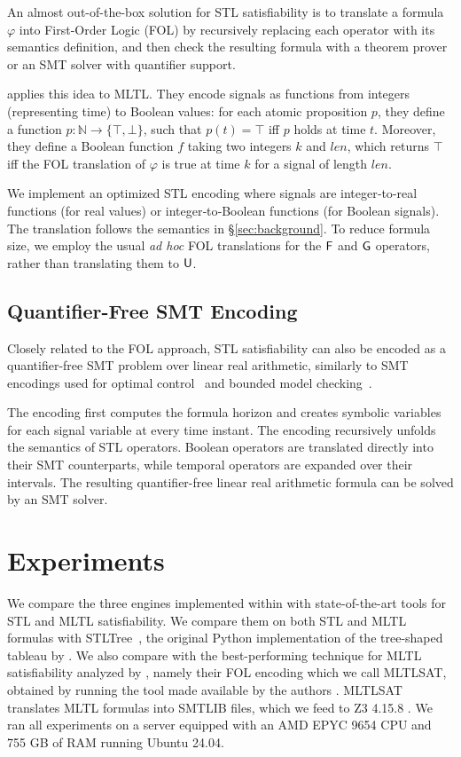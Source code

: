 \documentclass{easychair}
\begin{document}
An almost out-of-the-box solution for STL satisfiability is to translate a formula $\varphi$ into First-Order Logic (FOL) by recursively replacing each operator with its semantics definition, and then check the resulting formula with a theorem prover or an SMT solver with quantifier support.

\citet{LiVR22} applies this idea to MLTL. They encode signals as functions from integers (representing time) to Boolean values: for each atomic proposition $p$, they define a function $p : \mathbb{N} \rightarrow \{\top, \bot\}$, such that $p(t) = \top$ iff $p$ holds at time $t$.
Moreover, they define a Boolean function $f$ taking two integers $k$ and $\mathit{len}$, which returns $\top$ iff the FOL translation of $\varphi$ is true at time $k$ for a signal of length $\mathit{len}$.

We implement an optimized STL encoding where signals are integer‑to‑real functions (for real values) or integer‑to‑Boolean functions (for Boolean signals).  The translation follows the semantics in \S\ref{sec:background}. 
%
To reduce formula size, we employ the usual \emph{ad hoc} FOL translations for the $\mathsf{F}{}$ and $\mathsf{G}{}$ operators, rather than translating them to $\mathsf{U}{}$.

\subsection{Quantifier-Free SMT Encoding}
\label{sec:smt-encoding}

Closely related to the FOL approach, STL satisfiability can also be encoded as a quantifier-free SMT problem over linear real arithmetic, similarly to SMT encodings used for optimal control~\cite{RamanDMMSS14} and bounded model checking~\cite{ClarkeBRZ01}.

The encoding first computes the formula horizon and creates symbolic variables for each signal variable at every time instant. The encoding recursively unfolds the semantics of STL operators. Boolean operators are translated directly into their SMT counterparts, while temporal operators are expanded over their intervals. The resulting quantifier-free linear real arithmetic formula can be solved by an SMT solver.

\section{Experiments}
\label{sec:experiments}

We compare the three engines implemented within \stlsat{} with state-of-the-art tools for STL and MLTL satisfiability.
We compare them on both STL and MLTL formulas with STLTree~\cite{stltree}, the original Python implementation of the tree-shaped tableau by \citet{MelaniBC25}.
We also compare with the best-performing technique for MLTL satisfiability analyzed by \citet{LiVR22}, namely their FOL encoding which we call MLTLSAT, obtained by running the tool made available by the authors \cite{mltlsat}. MLTLSAT translates MLTL formulas into SMTLIB files, which we feed to Z3 4.15.8 \cite{Z3}.
%
We ran all experiments on a server equipped with an AMD EPYC 9654 CPU and 755 GB of RAM
running Ubuntu 24.04.
\end{document}

